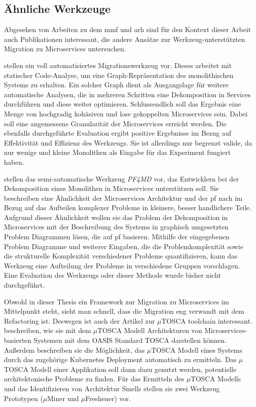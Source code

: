 \subsection{Ähnliche Werkzeuge}

Abgesehen von Arbeiten zu dem \gls{mmf} und \gls{arh} sind für den Kontext dieser Arbeit auch Publikationen interessant, die andere Ansätze zur Werkzeug-unterstützten Migration zu Microservices untersuchen.

 stellen ein voll automatisiertes Migrationswerkzeug vor.
Dieses arbeitet mit statischer Code-Analyse, um eine Graph-Repräsentation des monolithischen Systems zu erhalten.
Ein solcher Graph dient als Ausgangslage für weitere automatische Analysen, die in mehreren Schritten eine Dekomposition in Services durchführen und diese weiter optimieren.
Schlussendlich soll das Ergebnis eine Menge von hochgradig kohäsiven und lose gekoppelten Microservices sein.
Dabei soll eine angemessene Granularität der Microservices erreicht werden.
Die ebenfalls durchgeführte Evaluation ergibt positive Ergebnisse im Bezug auf Effektivität und Effizienz des Werkzeugs.
Sie ist allerdings nur begrenzt valide, da nur wenige und kleine Monolithen als Eingabe für das Experiment fungiert haben.

 stellen das semi-automatische Werkzeug \emph{PF4MD} vor, das Entwicklern bei der Dekomposition eines Monolithen in Microservices unterstützen soll.
Sie beschreiben eine Ähnlichkeit der Microservices Architektur und der \gls{pf} nach  im Bezug auf das Aufteilen komplexer Probleme in kleinere, besser handlichere Teile.
Aufgrund dieser Ähnlichkeit wollen sie das Problem der Dekomposition in Microservices mit der Beschreibung des Systems in graphisch umgesetzten Problem Diagrammen lösen, die auf \gls{pf} basieren.
Mithilfe der eingegebenen Problem Diagramme und weiterer Eingaben, die die Problemkomplexität sowie die strukturelle Komplexität verschiedener Probleme quantifizieren, kann das Werkzeug eine Aufteilung der Probleme in verschiedene Gruppen vorschlagen.
Eine Evaluation des Werkzeugs oder dieser Methode wurde bisher nicht durchgeführt.

Obwohl in dieser Thesis ein Framework zur Migration zu Microservices im Mittelpunkt steht, sieht man schnell, dass die Migration eng verwandt mit dem Refactoring ist.
Deswegen ist auch der Artikel zur $\mu$TOSCA toolchain interessant.
 beschreiben, wie sie mit dem  $\mu$TOSCA Modell Architekturen von Microservices-basierten Systemen mit dem OASIS Standard TOSCA darstellen können.
Außerdem beschreiben sie die Möglichkeit, das $\mu$TOSCA Modell eines Systems durch das zugehörige Kubernetes Deployment automatisch zu ermitteln.
Das $\mu$TOSCA Modell einer Applikation soll dann dazu genutzt werden, potentielle architektonische Probleme zu finden.
Für das Ermitteln des $\mu$TOSCA Modells und das Identifizieren von Architektur Smells stellen sie zwei Werkzeug Prototypen ($\mu$Miner und $\mu$Freshener) vor.

